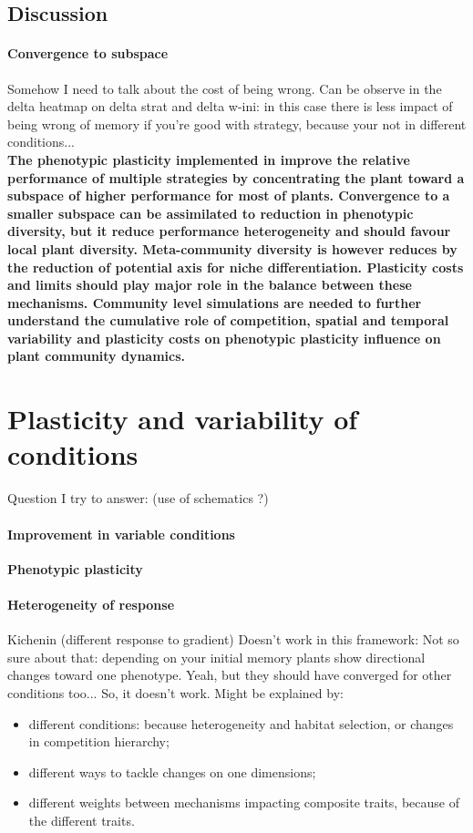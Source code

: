 \subsection{Discussion}

\paragraph{Convergence to subspace}

Somehow I need to talk about the cost of being wrong. Can be observe in the delta heatmap on delta strat and delta w-ini: in this case there is less impact of being wrong of memory if you're good with strategy, because your not in different conditions...\\

\textbf{The phenotypic plasticity implemented in \model improve the relative performance of multiple strategies by concentrating the plant toward a subspace of higher performance for most of plants. Convergence to a smaller subspace can be assimilated to reduction in phenotypic diversity, but it reduce performance heterogeneity and should favour local plant diversity. Meta-community diversity is however reduces by the reduction of potential axis for niche differentiation. Plasticity costs and limits should play major role in the balance between these mechanisms. Community level simulations are needed to further understand the cumulative role of competition, spatial and temporal variability and plasticity costs on phenotypic plasticity influence on plant community dynamics.}


\section{Plasticity and variability of conditions}
Question I try to answer: (use of schematics ?)

\paragraph{Improvement in variable conditions}

\textbf{Phenotypic plasticity }

\paragraph{Heterogeneity of response}

Kichenin (different response to gradient) Doesn't work in this framework: Not so sure about that: depending on your initial memory plants show directional changes toward one phenotype. Yeah, but they should have converged for other conditions too... So, it doesn't work. Might be explained by:
\begin{itemize}
\item different conditions: because heterogeneity and habitat selection, or changes in competition hierarchy;
\item different ways to tackle changes on one dimensions;
\item different weights between mechanisms impacting composite traits, because of the different traits.
\end{itemize}


